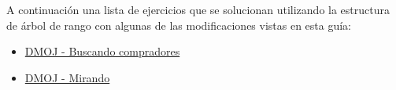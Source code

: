 A continuación una lista de ejercicios que se solucionan utilizando la estructura de árbol de rango con algunas de las modificaciones vistas en esta guía:

\begin{itemize}
	\item \href{https://dmoj.uclv.edu.cu/problem/buyers}{DMOJ - Buscando compradores}
	\item \href{https://dmoj.uclv.edu.cu/problem/lookup}{DMOJ - Mirando}
\end{itemize}